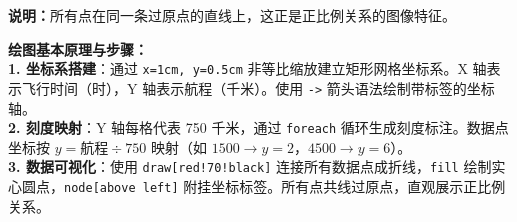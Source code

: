 \begin{center}
\end{center}

\vspace{0.4cm}

{\small\color{gray}
\textbf{说明：}所有点在同一条过原点的直线上，这正是正比例关系的图像特征。}

\vspace{0.6cm}

{\small\color{blue!70!black}
\textbf{绘图基本原理与步骤：}\\
\textbf{1. 坐标系搭建}：通过 \texttt{x=1cm, y=0.5cm} 非等比缩放建立矩形网格坐标系。X 轴表示飞行时间（时），Y 轴表示航程（千米）。使用 \texttt{->} 箭头语法绘制带标签的坐标轴。\\
\textbf{2. 刻度映射}：Y 轴每格代表 750 千米，通过 \texttt{foreach} 循环生成刻度标注。数据点坐标按 $y = \text{航程} \div 750$ 映射（如 $1500 \to y=2$，$4500 \to y=6$）。\\
\textbf{3. 数据可视化}：使用 \texttt{draw[red!70!black]} 连接所有数据点成折线，\texttt{fill} 绘制实心圆点，\texttt{node[above left]} 附挂坐标标签。所有点共线过原点，直观展示正比例关系。
}


\newpage
